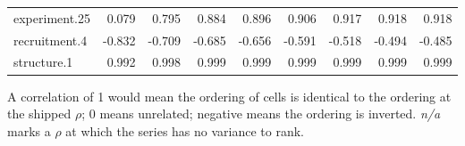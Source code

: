 \begin{table}[htbp]
\begin{tabular}{l r r r r r r r r}
    experiment.25 & 0.079 & 0.795 & 0.884 & 0.896 & 0.906 & 0.917 & 0.918 & 0.918 \\
    recruitment.4 & -0.832 & -0.709 & -0.685 & -0.656 & -0.591 & -0.518 & -0.494 & -0.485 \\
    structure.1 & 0.992 & 0.998 & 0.999 & 0.999 & 0.999 & 0.999 & 0.999 & 0.999 \\
    \bottomrule
  \end{tabular}
  \par\smallskip\footnotesize A correlation of 1 would mean the ordering of cells is identical to the ordering at the shipped $\rho$; 0 means unrelated; negative means the ordering is inverted. \emph{n/a} marks a $\rho$ at which the series has no variance to rank.
\end{table}
